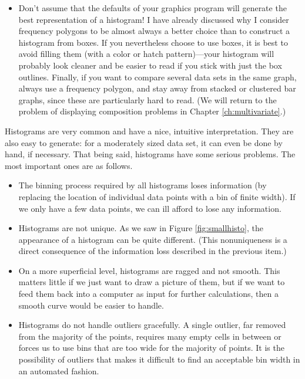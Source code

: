 \begin{itemize}
\item Don't assume that the defaults of your graphics program will
  generate the best representation of a histogram! I have already
  discussed why I consider frequency polygons to be almost always a
  better choice than to construct a histogram from boxes.  If you
  nevertheless choose to use boxes, it is best to avoid filling them
  (with a color or hatch pattern)---your histogram will probably look
  cleaner and be easier to read if you stick with just the box
  outlines. Finally, if you want to compare several data sets in the
  same graph, always use a frequency polygon, and stay away from
  stacked or clustered bar graphs, since these are particularly hard
  to read. (We will return to the problem of displaying composition
  problems in Chapter \ref{ch:multivariate}.)
\end{itemize}

Histograms are very common and have a nice, intuitive interpretation.
They are also easy to generate: for a moderately sized data set, it
can even be done by hand, if necessary.  That being said, histograms
have some serious problems.  The most important ones are as follows.

\begin{itemize}
\item The binning process required by all histograms loses information
  (by replacing the location of individual data points with a bin of
  finite width). If we only have a few data points, we can ill afford
  to lose any information.

\item Histograms are not unique. As we saw in Figure
  \ref{fig:smallhisto}, the appearance of a histogram can be quite
  different. (This nonuniqueness is a direct consequence of the
  information loss described in the previous item.)

\item On a more superficial level, histograms are ragged and not
  smooth.  This matters little if we just want to draw a picture of
  them, but if we want to feed them back into a computer as input for
  further calculations, then a smooth curve would be easier to handle.

\item Histograms do not handle outliers gracefully. A single outlier,
  far removed from the majority of the points, requires many empty
  cells in between or forces us to use bins that are too wide for the
  majority of points. It is the possibility of outliers that makes it
  difficult to find an acceptable bin width in an automated fashion.
\end{itemize}

